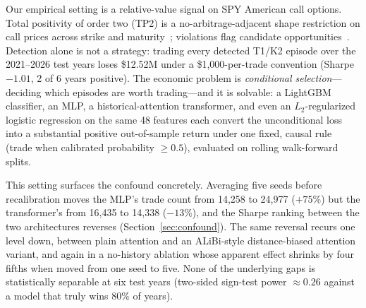 \documentclass[sigconf,review]{acmart}
\begin{document}
Our empirical setting is a relative-value signal on SPY American call options. Total positivity of order two (TP2) is a no-arbitrage-adjacent shape restriction on call prices across strike and maturity~\cite{glasserman2026tp2theory,glasserman2023convexity}; violations flag candidate opportunities~\cite{glasserman2025tp2}. Detection alone is not a strategy: trading every detected T1/K2 episode over the 2021--2026 test years loses \$12.52M under a \$1{,}000-per-trade convention (Sharpe $-1.01$, 2 of 6 years positive). The economic problem is \emph{conditional selection}---deciding which episodes are worth trading---and it is solvable: a LightGBM classifier, an MLP, a historical-attention transformer, and even an $L_2$-regularized logistic regression on the same 48 features each convert the unconditional loss into a substantial positive out-of-sample return under one fixed, causal rule (trade when calibrated probability $\ge0.5$), evaluated on rolling walk-forward splits.

This setting surfaces the confound concretely. Averaging five seeds before recalibration moves the MLP's trade count from 14{,}258 to 24{,}977 ($+75\%$) but the transformer's from 16{,}435 to 14{,}338 ($-13\%$), and the Sharpe ranking between the two architectures reverses (Section~\ref{sec:confound}). The same reversal recurs one level down, between plain attention and an ALiBi-style distance-biased attention variant, and again in a no-history ablation whose apparent effect shrinks by four fifths when moved from one seed to five. None of the underlying gaps is statistically separable at six test years (two-sided sign-test power $\approx0.26$ against a model that truly wins 80\% of years).
\end{document}
